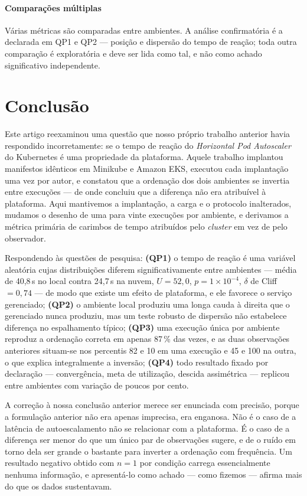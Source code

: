 \documentclass[conference]{IEEEtran}
\begin{document}
\paragraph{Comparações múltiplas} Várias métricas são comparadas entre ambientes.
A análise confirmatória é a declarada em QP1 e QP2 --- posição e dispersão do
tempo de reação; toda outra comparação é exploratória e deve ser lida como tal,
e não como achado significativo independente.

\section{Conclusão}
\label{sec:conclusao}

Este artigo reexaminou uma questão que nosso próprio trabalho anterior havia
respondido incorretamente: se o tempo de reação do \emph{Horizontal Pod
Autoscaler} do Kubernetes é uma propriedade da plataforma. Aquele trabalho
implantou manifestos idênticos em Minikube e Amazon EKS, executou cada
implantação uma vez por autor, e constatou que a ordenação dos dois ambientes se
invertia entre execuções --- de onde concluiu que a diferença não era atribuível
à plataforma. Aqui mantivemos a implantação, a carga e o protocolo inalterados,
mudamos o desenho de uma para vinte execuções por ambiente, e derivamos a métrica
primária de carimbos de tempo atribuídos pelo \emph{cluster} em vez de pelo
observador.

Respondendo às questões de pesquisa: \textbf{(QP1)} o tempo de reação é uma
variável aleatória cujas distribuições diferem significativamente entre ambientes
--- média de 40,8\,s no local contra 24,7\,s na nuvem, $U=52{,}0$,
$p=1\times10^{-4}$, $\delta$ de Cliff $=0{,}74$ --- de modo que existe um efeito
de plataforma, e ele favorece o serviço gerenciado; \textbf{(QP2)} o ambiente
local produziu uma longa cauda à direita que o gerenciado nunca produziu, mas um
teste robusto de dispersão não estabelece diferença no espalhamento típico;
\textbf{(QP3)} uma execução única por ambiente reproduz a ordenação correta em
apenas 87\,\% das vezes, e as duas observações anteriores situam-se nos percentis
82 e 10 em uma execução e 45 e 100 na outra, o que explica integralmente a
inversão; \textbf{(QP4)} todo resultado fixado por declaração --- convergência,
meta de utilização, descida assimétrica --- replicou entre ambientes com variação
de poucos por cento.

A correção à nossa conclusão anterior merece ser enunciada com precisão, porque a
formulação anterior não era apenas imprecisa, era enganosa. Não é o caso de a
latência de autoescalamento não se relacionar com a plataforma. É o caso de a
diferença ser menor do que um único par de observações sugere, e de o ruído em
torno dela ser grande o bastante para inverter a ordenação com frequência. Um
resultado negativo obtido com $n=1$ por condição carrega essencialmente nenhuma
informação, e apresentá-lo como achado --- como fizemos --- afirma mais do que os
dados sustentavam.
\end{document}
